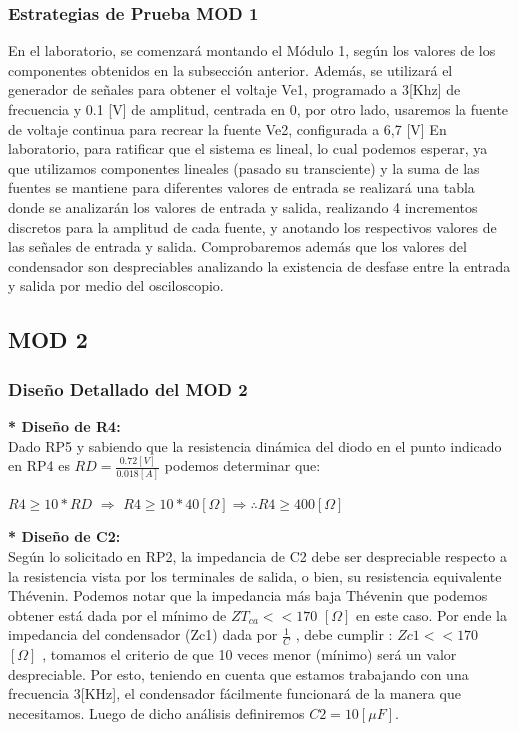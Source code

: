 \subsubsection{Estrategias de Prueba MOD 1}
En el laboratorio, se comenzará montando el Módulo 1, según los valores de los componentes obtenidos en la subsección anterior. Además, se utilizará el generador de señales para obtener el voltaje Ve1, programado a 3[Khz] de frecuencia y 0.1 [V] de amplitud, centrada en 0, por otro lado, usaremos la fuente de voltaje continua para recrear la fuente Ve2, configurada a 6,7 [V]
En laboratorio, para ratificar que el sistema es lineal, lo cual podemos esperar, ya que utilizamos componentes lineales (pasado su transciente) y la suma de las fuentes se mantiene para diferentes valores de entrada se realizará una tabla donde se analizarán los valores de entrada y salida, realizando 4 incrementos discretos para la amplitud de cada fuente, y anotando los respectivos valores de las señales de entrada y salida.
 Comprobaremos además que los valores del condensador son despreciables analizando la existencia de desfase entre la entrada y salida por medio del osciloscopio.


\subsection{MOD 2}
\label{sec5.2.}
\subsubsection{Diseño Detallado del MOD 2}
\textbf{* Diseño de R4:}\\[0.2cm]
Dado RP5 y sabiendo que la resistencia dinámica del diodo en el punto indicado en RP4 es $RD = \frac{0.72[V]}{0.018[A]}$ podemos determinar que:\\[-0.2cm]

\begin{center}
$R4 \geq 10* RD$ \hspace{0.5cm} $\Rightarrow$ \hspace{0.5cm}$R4 \geq 10*40[\Omega]$\hspace{0.5cm}$\Rightarrow$\hspace{0.5cm}$\therefore R4 \geq 400[\Omega]$
\end{center}

\textbf{* Diseño de C2:}\\[0.2cm]
Según lo solicitado en RP2, la impedancia de C2 debe ser despreciable respecto a la resistencia vista por los terminales de salida, o bien, su resistencia equivalente Thévenin. Podemos notar que la impedancia más baja Thévenin que podemos obtener está dada por el mínimo de $ZT_{ca} << 170 $ $[\Omega]$ en este caso.
Por ende la impedancia del condensador (Zc1) dada por $\frac{1}{C}$ , debe cumplir :
$Zc1 << 170$ $[\Omega]$  , tomamos el criterio de que 10 veces menor (mínimo) será un valor despreciable. Por esto, teniendo en cuenta que estamos trabajando con una frecuencia 3[KHz], el condensador fácilmente funcionará de la manera que necesitamos. Luego de dicho análisis definiremos $C2 = 10[\mu F]$.\\[0.2cm]

